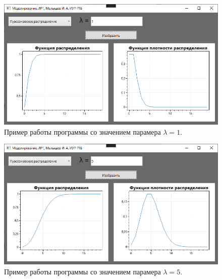 \documentclass[12pt]{report}
\begin{document}
\begin{figure}[H]
	\begin{center}
		\includegraphics[scale=0.6]{imgs/pois1.png}
	\end{center}
	\caption{Пример работы программы со значением парамера $\lambda = 1$.}
	\label{img:pois1}
\end{figure}

\begin{figure}[H]
	\begin{center}
		\includegraphics[scale=0.6]{imgs/pois2.png}
	\end{center}
	\caption{Пример работы программы со значением парамера $\lambda = 5$.}
	\label{img:pois2}
\end{figure}
\end{document}
